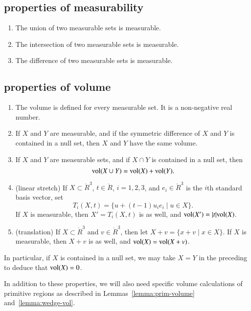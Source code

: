 \subsection{properties of measurability}

\begin{enumerate}%
\label{enum:measure}
 \item The union of two measurable sets is measurable.\\
 \item The intersection of two measurable sets is measurable.\\
 \item The difference of two measurable sets is measurable.
\end{enumerate}

\subsection{properties of volume}

\begin{enumerate}%
\label{enum:volume}
 \item The volume is defined for every measurable set.  It is
    a non-negative real number.
 \item If $X$ and $Y$ are  measurable, and if
 the symmetric difference of
 $X$ and $Y$ is contained in a null set, then 
    $X$ and $Y$ have the same volume.\\
 \item If $X$ and $Y$ are measurable sets, and if $X\cap
 Y$ is contained in a null set, then
    $$
    {\operatorname{vol}}(X\cup Y) = {\operatorname{vol}}(X) + {\operatorname{vol}}(Y).
    $$
  \item (linear stretch) If $X\subset \ring{R}^3$, $t\in\ring{R}$, 
    $i=1,2,3$, and $e_i\in\ring{R}^3$ is the $i$th standard basis vector,
    set 
      $$T_i(X,t) = \{ u + (t-1) u_i e_i \mid u\in X\}.
      $$
    If $X$ is measurable, then $X'=T_i(X,t)$ is as well,
    and ${\operatorname{vol}}(X') = |t|{\operatorname{vol}}(X)$.
  \item (translation) If $X\subset \ring{R}^3$ and $v\in\ring{R}^3$, then let
    $X+v = \{x + v\mid x\in X\}$.  If $X$ is measurable, then $X+v$ is
    as well, and ${\operatorname{vol}}(X) = {\operatorname{vol}}(X+v)$.
\end{enumerate}

In particular, if $X$ is contained in a null set, we may take
$X=Y$ in the preceding to deduce that ${\operatorname{vol}}(X)=0$.

In addition to these properties, we will also need specific
volume calculations of primitive regions as described in
Lemmas~\ref{lemma:prim-volume} and~\ref{lemma:wedge-vol}.

